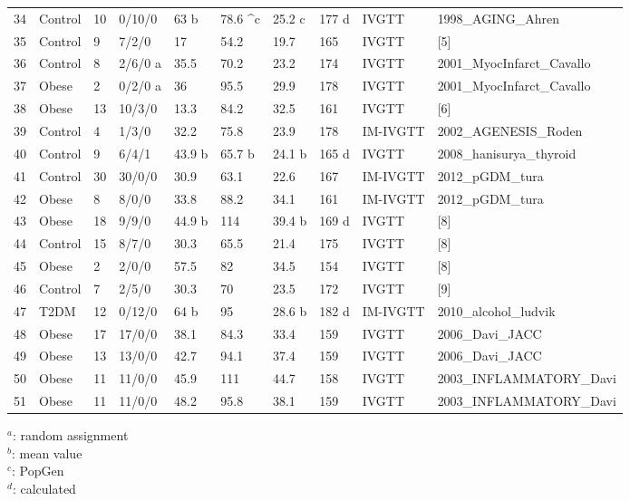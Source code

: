 \documentclass[utf8]{frontiersSCNS} %
\begin{document}
\begin{table}[h]
{\begin{tabular}{llllllllll}
34 & Control & 10 & 0/10/0  & 63 b   & 78.6 ^c & 25.2 c & 177 d & IVGTT    & 1998_AGING_Ahren         \\
35 & Control & 9  & 7/2/0   & 17     & 54.2    & 19.7   & 165   & IVGTT    & [5]                      \\
36 & Control & 8  & 2/6/0 a & 35.5   & 70.2    & 23.2   & 174   & IVGTT    & 2001_MyocInfarct_Cavallo \\
37 & Obese   & 2  & 0/2/0 a & 36     & 95.5    & 29.9   & 178   & IVGTT    & 2001_MyocInfarct_Cavallo \\
38 & Obese   & 13 & 10/3/0  & 13.3   & 84.2    & 32.5   & 161   & IVGTT    & [6]                      \\
39 & Control & 4  & 1/3/0   & 32.2   & 75.8    & 23.9   & 178   & IM-IVGTT & 2002_AGENESIS_Roden      \\
40 &
  Control &
  9 &
  6/4/1 &
  43.9 b &
  65.7 b &
  24.1 b &
  165 d &
  IVGTT &
  2008_hanisurya_thyroid \\
41 & Control & 30 & 30/0/0  & 30.9   & 63.1    & 22.6   & 167   & IM-IVGTT & 2012_pGDM_tura           \\
42 & Obese   & 8  & 8/0/0   & 33.8   & 88.2    & 34.1   & 161   & IM-IVGTT & 2012_pGDM_tura           \\
43 & Obese   & 18 & 9/9/0   & 44.9 b & 114     & 39.4 b & 169 d & IVGTT    & [8]                      \\
44 & Control & 15 & 8/7/0   & 30.3   & 65.5    & 21.4   & 175   & IVGTT    & [8]                      \\
45 & Obese   & 2  & 2/0/0   & 57.5   & 82      & 34.5   & 154   & IVGTT    & [8]                      \\
46 & Control & 7  & 2/5/0   & 30.3   & 70      & 23.5   & 172   & IVGTT    & [9]                      \\
47 & T2DM    & 12 & 0/12/0  & 64 b   & 95      & 28.6 b & 182 d & IM-IVGTT & 2010_alcohol_ludvik      \\
48 & Obese   & 17 & 17/0/0  & 38.1   & 84.3    & 33.4   & 159   & IVGTT    & 2006_Davi_JACC           \\
49 & Obese   & 13 & 13/0/0  & 42.7   & 94.1    & 37.4   & 159   & IVGTT    & 2006_Davi_JACC           \\
50 & Obese   & 11 & 11/0/0  & 45.9   & 111     & 44.7   & 158   & IVGTT    & 2003_INFLAMMATORY_Davi   \\
51 & Obese   & 11 & 11/0/0  & 48.2   & 95.8    & 38.1   & 159   & IVGTT    & 2003_INFLAMMATORY_Davi  \\ \hline
\end{tabular}}
\end{table}
$^a$: random assignment \\
$^b$: mean value \\
$^c$: PopGen \\
$^d$: calculated \\
\end{document}
